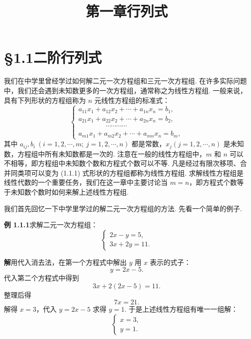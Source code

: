 \documentclass[UTF8,12pt,a4paper,fontset=fandol]{ctexart}
\title{第一章\quad 行列式}
\author{}
\date{}
\begin{document}
\maketitle

\section*{§1.1\quad 二阶行列式}

我们在中学里曾经学过如何解二元一次方程组和三元一次方程组. 在许多实际问题中，我们还会遇到未知数更多的一次方程组，通常称之为线性方程组. 一般来说，具有下列形状的方程组称为 $n$ 元线性方程组的标准式：
\begin{equation}
\left\{
\begin{array}{l}
a_{11}x_1+a_{12}x_2+\cdots+a_{1n}x_n=b_1,\\
a_{21}x_1+a_{22}x_2+\cdots+a_{2n}x_n=b_2,\\
\hspace{4em}\cdots\cdots\cdots\cdots\\
a_{m1}x_1+a_{m2}x_2+\cdots+a_{mn}x_n=b_m,
\end{array}
\right.
\tag{1.1.1}
\end{equation}
其中 $a_{ij}, b_i\ (i=1,2,\cdots,m;\ j=1,2,\cdots,n)$ 都是常数，$x_j(j=1,2,\cdots,n)$ 是未知数，方程组中所有未知数都是一次的. 注意在一般的线性方程组中，$m$ 和 $n$ 可以不相等，即方程组中未知数个数和方程式个数可以不等. 凡是经过有限次移项、合并同类项可以变为 (1.1.1) 式形状的方程组都称为线性方程组. 求解线性方程组是线性代数的一个重要任务，我们在这一章中主要讨论当 $m=n$，即方程式个数等于未知数个数时如何来解上述线性方程组.

我们首先回忆一下中学里学过的解二元一次方程组的方法. 先看一个简单的例子.

\noindent\textbf{例 1.1.1}\quad 求解二元一次方程组：
\begin{equation}
\left\{
\begin{array}{l}
2x-y=5,\\
3x+2y=11.
\end{array}
\right.
\tag{1.1.2}
\end{equation}

\noindent\textbf{解}\quad 用代入消去法，在第一个方程式中解出 $y$ 用 $x$ 表示的式子：
\[
y=2x-5.
\]
代入第二个方程式中得到
\[
3x+2(2x-5)=11.
\]
整理后得
\[
7x=21.
\]
解得 $x=3$，代入 $y=2x-5$ 求得 $y=1$. 于是上述线性方程组有唯一一组解：
\[
\left\{
\begin{array}{l}
x=3,\\
y=1.
\end{array}
\right.
\]
\end{document}
